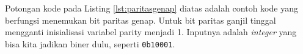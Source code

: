Potongan kode pada Listing \ref{lst:paritasgenap} diatas adalah contoh kode yang berfungsi menemukan bit paritas genap. Untuk bit paritas ganjil tinggal mengganti inisialisasi variabel parity menjadi 1. Inputnya adalah \emph{integer} yang bisa kita jadikan biner dulu, seperti \verb|0b10001|.


\lipsum[6-7]
